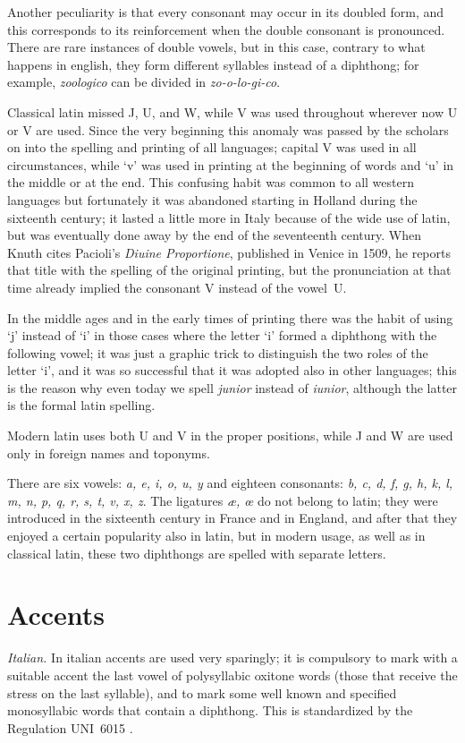 \documentclass{ltugboat}
\begin{document}
Another  peculiarity  is that every consonant may occur in its doubled form,
and this corresponds to its  reinforcement  when  the  double  consonant  is
pronounced.  There  are  rare  instances of double vowels, but in this case,
contrary to what happens in english, they form different  syllables  instead
of  a  diphthong;  for  example,  {\it  zoologico}  can  be  divided in {\it
zo-o-lo-gi-co}.

 Classical latin missed J, U, and W, while V was used
throughout wherever now U or V are  used.  Since  the  very  beginning  this
anomaly  was passed by the scholars on into the spelling and printing of all
languages; capital V was used in all circumstances, while `v'  was  used  in
printing at the beginning of words and `u' in the middle or at the end. This
confusing habit was common to all western languages but fortunately  it  was
abandoned  starting  in  Holland  during  the sixteenth century; it lasted a
little more in Italy because of the wide use of latin,  but  was  eventually
done  away by the end of the seventeenth century. When Knuth \cite[reference
106]{knuth} cites Pacioli's {\it Diuine Proportione}, published in Venice in
1509,  he reports that title with the spelling of the original printing, but
the pronunciation at that time already implied the consonant  V  instead  of
the vowel~U.

In the middle ages and in the early times of printing there was the habit of
using `j' instead of `i' in those  cases  where  the  letter  `i'  formed  a
diphthong  with  the  following  vowel;  it  was  just  a  graphic  trick to
distinguish the two roles of the letter `i', and it was so  successful  that
it was adopted also in other languages; this is the reason why even today we
spell {\it junior} instead of {\it  iunior},  although  the  latter  is  the
formal latin spelling.

Modern  latin  uses  both U and V in the proper positions, while J and W are
used only in foreign names and toponyms.

There  are  six vowels: {\it a, e, i, o, u, y} and eighteen consonants: {\it
b, c, d, f, g, h, k, l, m, n, p, q, r, s, t, v, x, z}.  The  ligatures  {\it
\ae,  \oe}  do  not  belong  to latin; they were introduced in the sixteenth
century in France and in England, and after  that  they  enjoyed  a  certain
popularity  also  in  latin,  but  in  modern usage, as well as in classical
latin, these two diphthongs are spelled with separate letters.

\section{Accents}
{\it  Italian.} In italian accents are used very sparingly; it is compulsory
to mark with a suitable accent the last vowel of polysyllabic oxitone  words
(those  that receive the stress on the last syllable), and to mark some well
known and specified monosyllabic words that contain  a  diphthong.  This  is
standardized by the Regulation UNI~6015 \cite{6015}.
\end{document}
